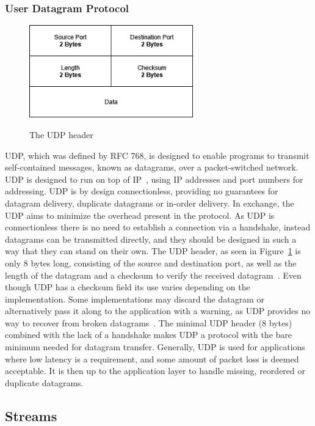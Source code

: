 \documentclass[english, 12pt, a4paper, elec, utf8, a-2b, online]{aaltothesis}
\begin{document}
\subsubsection{User Datagram Protocol \label{UDP}}
\label{sec:udp}
\begin{figure}[b]
	\centering
	\includegraphics[alt={A block diagram of the UDP header format, detailing its fields and their sizes.}, height=4cm]{./images/udp_header.png}
	\caption{The UDP header}
	\label{fig:udp_header}
\end{figure}
UDP, which was defined by RFC 768, is designed to
enable programs to transmit self-contained messages, known as datagrams, over a
packet-switched network. UDP is designed to run on top of IP~\cite{rfc791},
using IP addresses and port numbers for addressing. UDP is by design connectionless,
providing no guarantees for datagram delivery, duplicate datagrams or in-order
delivery. In exchange, the UDP aims to minimize the overhead present in the protocol.
As UDP is connectionless there is no need to establish a connection via a handshake,
instead datagrams can be transmitted directly, and they should be designed in
such a way that they can stand on their own. The UDP header, as seen in Figure~\ref{fig:udp_header}
is only 8 bytes long,
consisting of the source and destination port, as well as the length of the datagram
and a checksum to verify the received datagram~\cite{rfc768}. Even though UDP has
a checksum field its use varies depending on the implementation. Some implementations
may discard the datagram or alternatively pass it along to the application with a 
warning, as UDP provides no way to recover from broken datagrams~\cite{compute_rnetworking}. The minimal UDP
header (8 bytes) combined with the lack of a handshake makes UDP a protocol with
the bare minimum needed for datagram transfer.
Generally, UDP is used for applications where low latency is a requirement, and some
amount of packet loss is deemed acceptable. It is then up to the application layer to
handle missing, reordered or duplicate datagrams.

\subsection{Streams}
\end{document}

